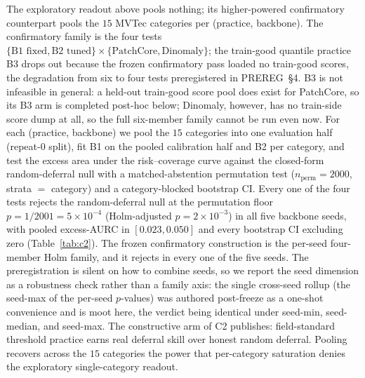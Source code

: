 \documentclass[11pt]{article}
\begin{document}
The exploratory readout above pools nothing; its higher-powered confirmatory counterpart pools the
$15$ MVTec categories per (practice, backbone). The confirmatory family is the four tests
$\{\text{B1 fixed},\text{B2 tuned}\}\times\{\text{PatchCore},\text{Dinomaly}\}$; the train-good
quantile practice B3 drops out because the frozen confirmatory pass loaded no train-good scores,
the degradation from six to four tests preregistered in PREREG~\S4. B3 is not infeasible in general:
a held-out train-good score pool does exist for PatchCore, so its B3 arm is completed
post-hoc below; Dinomaly, however, has no train-side score dump at all, so the full six-member
family cannot be run even now. For each (practice, backbone) we pool
the $15$ categories into one evaluation half (repeat-$0$ split), fit B1 on the pooled calibration
half and B2 per category, and test the excess area under the risk--coverage curve against the
closed-form random-deferral null with a matched-abstention permutation test
($n_{\text{perm}}=2000$, strata $=$ category) and a category-blocked bootstrap CI. Every one of the
four tests rejects the random-deferral null at the permutation floor
$p=1/2001=5\times10^{-4}$ (Holm-adjusted $p=2\times10^{-3}$) in all five backbone seeds, with
pooled excess-AURC in $[0.023,0.050]$ and every bootstrap CI excluding zero
(Table~\ref{tab:c2}). The frozen confirmatory construction is the per-seed four-member Holm family,
and it rejects in every one of the five seeds. The preregistration is silent on how to combine
seeds, so we report the seed dimension as a robustness check rather than a family axis: the single
cross-seed rollup (the seed-max of the per-seed $p$-values) was authored post-freeze as a one-shot
convenience and is moot here, the verdict being identical under seed-min, seed-median, and
seed-max. The constructive arm of C2 publishes: field-standard threshold practice earns real
deferral skill over honest random deferral. Pooling recovers across the $15$ categories the power
that per-category saturation denies the exploratory single-category readout.
\end{document}
